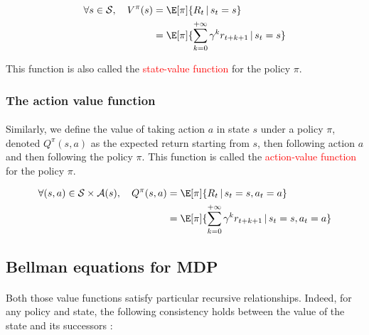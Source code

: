 \documentclass[a4paper]{article}
\begin{document}
{{			
			{
				\begin{equation}
					\begin{aligned}
						\forall{s}\in\mathcal{S}, \quad V^\pi(s) &= \E[\pi]{R_t \, \vert \, s_t=s}\\
														 &= \E[\pi]{\sum_{k=0}^{+\infty} \gamma^kr_{t+k+1} \, \vert \, s_t=s}
					\end{aligned}
				\end{equation}
			}
			
			\noindent This function is also called the \textcolor{red}{state-value function} for the policy $\pi$. 
			}
			\subsubsection{The action value function}
			{
			\paragraph{} Similarly, we define the value of taking action $a$ in state $s$ under a policy $\pi$, denoted $Q^\pi(s,a)$ as the expected return starting from $s$, then following action $a$ and then following the policy $\pi$. This function is called the \textcolor{red}{action-value function} for the policy $\pi$. 
			\vspace{10pt}
			
			{
				\begin{equation}
					\begin{aligned}
						\forall{(s,a)}\in\mathcal{S}\times\mathcal{A}(s), \quad Q^\pi(s,a) &= \E[\pi]{R_t \, \vert \, s_t=s, a_t=a}\\
														 &= \E[\pi]{\sum_{k=0}^{+\infty} \gamma^kr_{t+k+1} \, \vert \, s_t=s, a_t=a}
					\end{aligned}
				\end{equation}
			}
		}
		
		\subsection{Bellman equations for MDP}
		{
			\paragraph{} Both those value functions satisfy particular recursive relationships. Indeed, for any policy and state, the following consistency holds between the value of the state and its successors : 
			
}}
\end{document}
